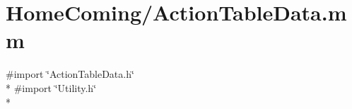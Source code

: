 \hypertarget{_action_table_data_8mm}{\section{Home\-Coming/\-Action\-Table\-Data.mm}
\label{_action_table_data_8mm}
}
{\ttfamily \#import \char`\"{}Action\-Table\-Data.\-h\char`\"{}}\\*
{\ttfamily \#import \char`\"{}Utility.\-h\char`\"{}}\\*
